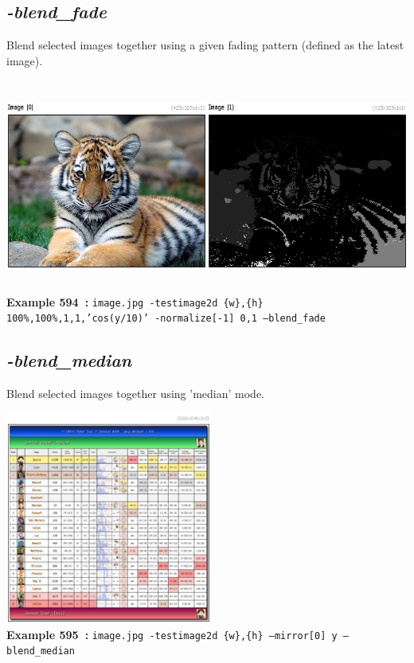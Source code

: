 \documentclass[a4paper,11pt,twoside]{book}
\begin{document}
\subsection{\emph{-blend\_fade} }\vspace*{-0.5em}
Blend selected images together using a given fading pattern (defined as the latest image).
\begin{center}\includegraphics[keepaspectratio=true,height=7cm,width=\textwidth]{img/gmic_def594.jpg}\\
{\footnotesize \textbf{Example 594~:} \texttt{image.jpg -testimage2d \{w\},\{h\} 100\%,100\%,1,1,'cos(y/10)' -normalize[-1] 0,1 --blend\_fade}}
\end{center}

\subsection{\emph{-blend\_median} }\vspace*{-0.5em}
Blend selected images together using 'median' mode.
\begin{center}\includegraphics[keepaspectratio=true,height=7cm,width=\textwidth]{img/gmic_def595.jpg}\\
{\footnotesize \textbf{Example 595~:} \texttt{image.jpg -testimage2d \{w\},\{h\} --mirror[0] y --blend\_median}}
\end{center}
\end{document}
